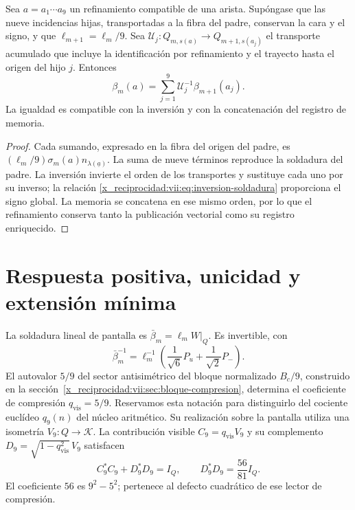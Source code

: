 \begin{proposition}
\label{x_reciprocidad:vii:prop:refinamiento-soldadura}
Sea \(a=a_1\cdots a_9\) un refinamiento compatible de una arista.
Supóngase que las nueve incidencias hijas, transportadas a la fibra del
padre, conservan la cara y el signo, y que
\(\ell_{m+1}=\ell_m/9\). Sea
\(\mathcal U_j:Q_{m,s(a)}\longrightarrow Q_{m+1,s(a_j)}\)
el transporte acumulado que incluye la identificación por refinamiento
y el trayecto hasta el origen del hijo \(j\). Entonces
\[
 \beta_m(a)=
 \sum_{j=1}^{9}\mathcal U_j^{-1}\beta_{m+1}(a_j).
\]
La igualdad es compatible con la inversión y con la concatenación
del registro de memoria.
\end{proposition}

\begin{proof}
Cada sumando, expresado en la fibra del origen del padre, es
\((\ell_m/9)\sigma_m(a)n_{\lambda(\underline a)}\).
La suma de nueve términos reproduce la soldadura del padre.
La inversión invierte el orden de los transportes y sustituye cada uno
por su inverso; la relación \eqref{x_reciprocidad:vii:eq:inversion-soldadura} proporciona
el signo global. La memoria se concatena en ese mismo orden, por lo
que el refinamiento conserva tanto la publicación vectorial como su
registro enriquecido.
\end{proof}

\section{Respuesta positiva, unicidad y extensión mínima}
\label{x_reciprocidad:vii:sec:respuesta-positiva}

La soldadura lineal de pantalla es
\(\bar\beta_m=\ell_mW|_Q\). Es invertible, con
\[
 \bar\beta_m^{-1}
 =\ell_m^{-1}\left(\frac1{\sqrt6}P_u+\frac1{\sqrt2}P_-\right).
\]
El autovalor \(5/9\) del sector antisimétrico del bloque normalizado
\(B_c/9\), construido en la sección~\ref{x_reciprocidad:vii:sec:bloque-compresion},
determina el coeficiente de
compresión \(q_{\mathrm{vis}}=5/9\). Reservamos esta notación para
distinguirlo del cociente euclídeo \(q_9(n)\) del núcleo aritmético.
Su realización sobre la pantalla utiliza una isometría
\(V_9:Q\longrightarrow\mathcal K\). La contribución visible
\(C_9=q_{\mathrm{vis}}V_9\) y su complemento
\(D_9=\sqrt{1-q_{\mathrm{vis}}^2}\,V_9\) satisfacen
\[
 C_9^*C_9+D_9^*D_9=I_Q,\qquad D_9^*D_9=\frac{56}{81}I_Q.
\]
El coeficiente \(56\) es \(9^2-5^2\); pertenece al defecto cuadrático
de ese lector de compresión.

